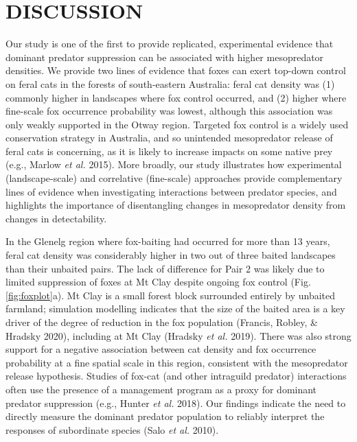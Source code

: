 \documentclass[preprint, 3p, authoryear]{elsarticle} %
\begin{document}
\newpage

\hypertarget{discussion}{%
\section{DISCUSSION}\label{discussion}}

Our study is one of the first to provide replicated, experimental evidence that dominant predator suppression can be associated with higher mesopredator densities. We provide two lines of evidence that foxes can exert top-down control on feral cats in the forests of south-eastern Australia: feral cat density was (1) commonly higher in landscapes where fox control occurred, and (2) higher where fine-scale fox occurrence probability was lowest, although this association was only weakly supported in the Otway region. Targeted fox control is a widely used conservation strategy in Australia, and so unintended mesopredator release of feral cats is concerning, as it is likely to increase impacts on some native prey (e.g., Marlow \emph{et al.} 2015). More broadly, our study illustrates how experimental (landscape-scale) and correlative (fine-scale) approaches provide complementary lines of evidence when investigating interactions between predator species, and highlights the importance of disentangling changes in mesopredator density from changes in detectability.

In the Glenelg region where fox-baiting had occurred for more than 13 years, feral cat density was considerably higher in two out of three baited landscapes than their unbaited pairs. The lack of difference for Pair 2 was likely due to limited suppression of foxes at Mt Clay despite ongoing fox control (Fig. \ref{fig:foxplot}a). Mt Clay is a small forest block surrounded entirely by unbaited farmland; simulation modelling indicates that the size of the baited area is a key driver of the degree of reduction in the fox population (Francis, Robley, \& Hradsky 2020), including at Mt Clay (Hradsky \emph{et al.} 2019). There was also strong support for a negative association between cat density and fox occurrence probability at a fine spatial scale in this region, consistent with the mesopredator release hypothesis. Studies of fox-cat (and other intraguild predator) interactions often use the presence of a management program as a proxy for dominant predator suppression (e.g., Hunter \emph{et al.} 2018). Our findings indicate the need to directly measure the dominant predator population to reliably interpret the responses of subordinate species (Salo \emph{et al.} 2010).
\end{document}
